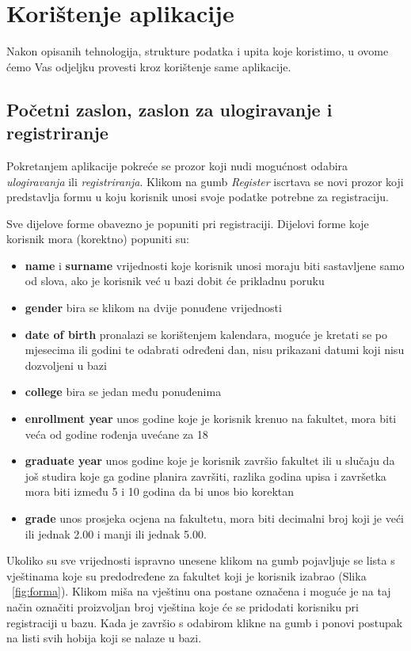 \documentclass[titlepage, 12pt]{scrartcl}
\begin{document}
	
	\newpage
	\section{Korištenje aplikacije}
	Nakon opisanih tehnologija, strukture podatka i upita koje koristimo, u ovome ćemo Vas odjeljku provesti kroz korištenje same aplikacije. 
	
	\subsection{Početni zaslon, zaslon za ulogiravanje i registriranje}
	Pokretanjem aplikacije pokreće se prozor koji nudi mogućnost odabira \emph{ulogiravanja} ili \emph{registriranja}. Klikom na gumb \emph{Register} iscrtava se novi prozor koji predstavlja formu u koju korisnik unosi svoje podatke potrebne za registraciju. 
	
	Sve dijelove forme obavezno je popuniti pri registraciji. Dijelovi forme koje korisnik mora (korektno) popuniti su:
	\begin{itemize}
		\item \textbf{name} i \textbf{surname} vrijednosti koje korisnik unosi moraju biti sastavljene samo od slova, ako je korisnik već u bazi dobit će prikladnu poruku
		\item \textbf{gender} bira se klikom na dvije ponuđene vrijednosti
		\item \textbf{date of birth} pronalazi se korištenjem kalendara, moguće je kretati se po mjesecima ili godini te odabrati određeni dan, nisu prikazani datumi koji nisu dozvoljeni u bazi
		\item \textbf{college} bira se jedan među ponuđenima
		\item \textbf{enrollment year} unos godine koje je korisnik krenuo na fakultet, mora biti veća od godine rođenja uvećane za 18
		\item \textbf{graduate year} unos godine koje je korisnik završio fakultet ili u slučaju da još studira koje ga godine planira završiti, razlika godina upisa i završetka mora biti između 5 i 10 godina da bi unos bio korektan
		\item \textbf{grade} unos prosjeka ocjena na fakultetu, mora biti decimalni broj koji je veći ili jednak 2.00 i manji ili jednak 5.00.
	\end{itemize}
	
	Ukoliko su sve vrijednosti ispravno unesene klikom na gumb pojavljuje se lista s vještinama koje su predodređene za fakultet koji je korisnik izabrao (Slika ~\ref{fig:forma}). Klikom miša na vještinu ona postane označena i moguće je na taj način označiti proizvoljan broj vještina koje će se pridodati korisniku pri registraciji u bazu. Kada je završio s odabirom klikne na gumb i ponovi postupak na listi svih hobija koji se nalaze u bazi. 
	
\end{document}
